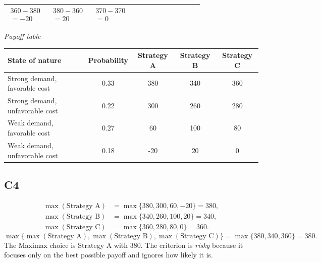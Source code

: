 \begin{ExamProblems}
\begin{center}
\begin{tabular}{l p{0.17\linewidth} p{0.2\linewidth} p{0.2\linewidth} p{0.2\linewidth}}
				$\begin{array}{l}
					360 - 380\\
					= -20
				\end{array}$ &
				$\begin{array}{l}
					380 - 360\\
					= 20
				\end{array}$ &
				$\begin{array}{l}
					370 - 370\\
					= 0
				\end{array}$ \\
				\bottomrule
		\end{tabular}
		\end{center}
		\begin{center}
			\textit{Payoff table} \\
			\begin{tabular}{l c c c c}
				\toprule
				State of nature & Probability & Strategy A & Strategy B & Strategy C \\
				\midrule
				Strong demand, favorable cost & 0.33 & 380 & 340 & 360 \\
				Strong demand, unfavorable cost & 0.22 & 300 & 260 & 280 \\
				Weak demand, favorable cost & 0.27 & 60 & 100 & 80 \\
				Weak demand, unfavorable cost & 0.18 & -20 & 20 & 0 \\
				\bottomrule
		\end{tabular}
		\end{center}

		\subsection*{C4}
		\[
		\begin{aligned}
		\max(\text{Strategy A}) &= \max\{380,300,60,-20\} = 380,\\
		\max(\text{Strategy B}) &= \max\{340,260,100,20\} = 340,\\
		\max(\text{Strategy C}) &= \max\{360,280,80,0\} = 360.
		\end{aligned}
		\]
		\[
		\max\{\max(\text{Strategy A}), \max(\text{Strategy B}), \max(\text{Strategy C})\}
		= \max\{380, 340, 360\}
		= 380.
		\]
		The Maximax choice is Strategy A with 380. The criterion is \emph{risky} because it focuses only on the best possible payoff and ignores how likely it is.


\end{ExamProblems}
